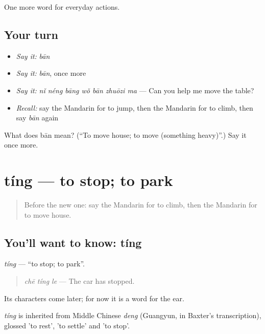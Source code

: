 \begin{grammarlens}[title={What you've built}]
One more word for everyday actions.
\end{grammarlens}

\subsection*{Your turn}
\begin{itemize}
\raggedright
  \item \emph{Say it:} \emph{bān}
  \item \emph{Say it:} \emph{bān}, once more
  \item \emph{Say it:} \emph{nǐ néng bāng wǒ bān zhuōzi ma} — Can you help me move the table?
  \item \emph{Recall:} say the Mandarin for to jump, then the Mandarin for to climb, then say \emph{bān} again
\end{itemize}

\begin{tcolorbox}[breakable,colback=teal!4,colframe=teal!35!black,title={Before you move on}]
What does bān mean? (\textquotedblleft{}To move house; to move (something heavy)\textquotedblright{}.) Say it once more.
\end{tcolorbox}
\section[tíng]{tíng — to stop; to park}

\label{lesson:ZH-C107-ting-stop}



\begin{quote}
Before the new one: say the Mandarin for to climb, then the Mandarin for to move house.
\end{quote}

\subsection*{You'll want to know: tíng}
\emph{tíng} — \textquotedblleft{}to stop; to park\textquotedblright{}.

\begin{quote}
\emph{chē tíng le} — The car has stopped.
\end{quote}

Its characters come later; for now it is a word for the ear.

\begin{cousinweb}
\emph{tíng} is inherited from Middle Chinese \emph{deng} (Guangyun, in Baxter's transcription), glossed 'to rest', 'to settle' and 'to stop'.
\end{cousinweb}

